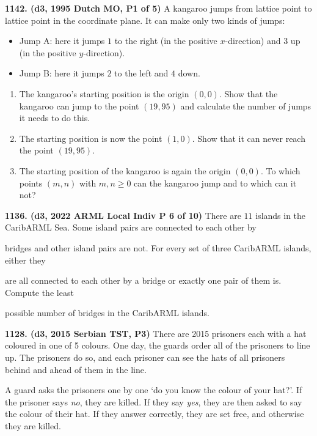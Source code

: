 \documentclass{article}
\begin{document}
        \textbf{1142. (\color{red}d3\color{black}, 1995 Dutch MO, P1 of 5)} A kangaroo jumps from lattice point to lattice point in the coordinate plane. It can make only two kinds of jumps:
        \begin{itemize}
                \item Jump A: here it jumps $1$ to the right (in the positive \(x\)-direction) and $3$ up (in the positive \(y\)-direction).
                \item Jump B: here it jumps $2$ to the left and $4$ down.
        \end{itemize}
        \begin{enumerate}
                \item The kangaroo's starting position is the origin \((0,0)\). Show that the kangaroo can jump to the point \((19,95)\) and calculate the number of jumps it needs to do this.
                \item The starting position is now the point \((1,0)\). Show that it can never reach the point \((19,95)\).
                \item The starting position of the kangaroo is again the origin \((0,0)\). To which points \((m,n)\) with \(m,n \geq 0\) can the kangaroo jump and to which can it not?
        \end{enumerate}

        \textbf{1136. (\color{red}d3\color{black}, 2022 ARML Local Indiv P 6 of 10)} There are $11$ islands in the CaribARML Sea. Some island pairs are connected to each other by

        bridges and other island pairs are not. For every set of three CaribARML islands, either they

        are all connected to each other by a bridge or exactly one pair of them is. Compute the least

        possible number of bridges in the CaribARML islands.

        \textbf{1128. (\color{red}d3\color{black}, 2015 Serbian TST, P3)} There are 2015 prisoners each with a hat coloured in one of 5 colours.
        One day, the guards order all of the prisoners to line up. The prisoners do so, and each prisoner can see the hats of all prisoners behind and ahead of them in the line.

        A guard asks the prisoners one by one `do you know the colour of your hat?'. If the prisoner says \emph{no}, they are killed. If they say \emph{yes}, they are then asked to say the colour of their hat. If they answer correctly, they are set free, and otherwise they are killed.
\end{document}
